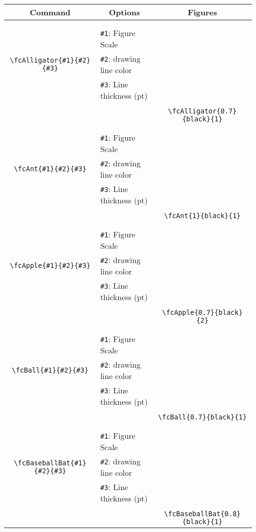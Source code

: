 \documentclass[x11names]{article}
\begin{document}
\begin{table}[H]\centering\begin{tabular}{|c|l|c|}\hline {\bf Command}& \multicolumn{1}{c|}{{\bf Options}} & {\bf Figures}\\  \hline	&&\multirow{5}{*}{\fcAlligator{0.7}{black}{1}}\\	&&\\	&\verb|#1|: Figure Scale &\\	\verb|\fcAlligator{#1}{#2}{#3}|&	\verb|#2|: drawing line color &\\	&\verb|#3|: Line thickness (pt) &\\ &&\\&&	\verb|\fcAlligator{0.7}{black}{1}|\\\hline 	
	&&\multirow{5}{*}{\fcAnt{1}{black}{1}}\\	&&\\	&\verb|#1|: Figure Scale &\\	\verb|\fcAnt{#1}{#2}{#3}|&	\verb|#2|: drawing line color &\\	&\verb|#3|: Line thickness (pt) &\\ &&\\&&	\verb|\fcAnt{1}{black}{1}|\\\hline 	
	&&\multirow{5}{*}{\fcApple{0.7}{black}{2}}\\	&&\\	&\verb|#1|: Figure Scale &\\	\verb|\fcApple{#1}{#2}{#3}|&	\verb|#2|: drawing line color &\\	&\verb|#3|: Line thickness (pt) &\\ &&\\&&	\verb|\fcApple{0.7}{black}{2}|\\\hline 	
	&&\multirow{5}{*}{\fcBall{0.7}{black}{1}}\\	&&\\	&\verb|#1|: Figure Scale &\\	\verb|\fcBall{#1}{#2}{#3}|&	\verb|#2|: drawing line color &\\	&\verb|#3|: Line thickness (pt) &\\ &&\\&&	\verb|\fcBall{0.7}{black}{1}|\\\hline 	
	&&\multirow{5}{*}{\fcBaseballBat{0.8}{black}{1}}\\	&&\\	&\verb|#1|: Figure Scale &\\	\verb|\fcBaseballBat{#1}{#2}{#3}|&	\verb|#2|: drawing line color &\\	&\verb|#3|: Line thickness (pt) &\\ &&\\&&	\verb|\fcBaseballBat{0.8}{black}{1}|\\\hline 	

\end{tabular}
\end{table}
\end{document}
